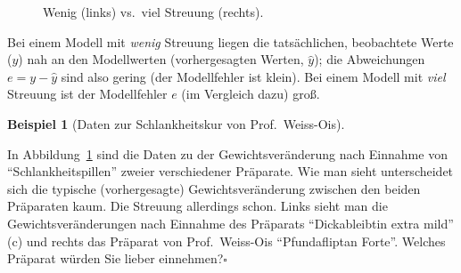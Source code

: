 \documentclass[
  a4paper,
]{scrbook}
\theoremstyle{definition}
\newtheorem{example}{Beispiel}[chapter]
\theoremstyle{definition}
\theoremstyle{definition}
\theoremstyle{remark}
\begin{document}
\begin{figure}


\caption{\label{fig-streuung}Wenig (links) vs.~viel Streuung (rechts).}

\end{figure}%

Bei einem Modell mit \emph{wenig} Streuung liegen die tatsächlichen,
beobachtete Werte (\(y\)) nah an den Modellwerten (vorhergesagten
Werten, \(\hat{y}\)); die Abweichungen \(e = y - \hat{y}\) sind also
gering (der Modellfehler ist klein). Bei einem Modell mit \emph{viel}
Streuung ist der Modellfehler \(e\) (im Vergleich dazu) groß.

\begin{example}[Daten zur Schlankheitskur von
Prof.~Weiss-Ois]\protect\hypertarget{exm-weiss-ois}{}\label{exm-weiss-ois}

In Abbildung~\ref{fig-streuung} sind die Daten zu der
Gewichtsveränderung nach Einnahme von ``Schlankheitspillen'' zweier
verschiedener Präparate. Wie man sieht unterscheidet sich die typische
(vorhergesagte) Gewichtsveränderung zwischen den beiden Präparaten kaum.
Die Streuung allerdings schon. Links sieht man die Gewichtsveränderungen
nach Einnahme des Präparats ``Dickableibtin extra mild'' (c) und rechts
das Präparat von Prof.~Weiss-Ois ``Pfundafliptan Forte''. Welches
Präparat würden Sie lieber einnehmen?\(\square\)

\end{example}
\end{document}
